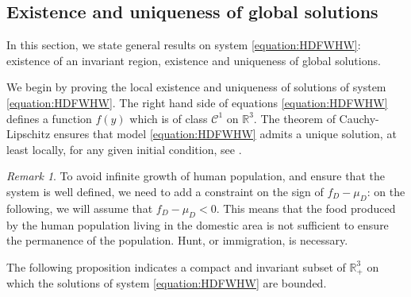\documentclass{article}
\theoremstyle{definition}
\theoremstyle{remark}
\newtheorem{remark}[theorem]{Remark}
\begin{document}
\subsection{Existence and uniqueness of global solutions}
In this section, we state general results on system \eqref{equation:HDFWHW}:  existence of an invariant region, existence and uniqueness of global solutions.

We begin by proving the local existence and uniqueness of solutions of system \eqref{equation:HDFWHW}. The right hand side of equations \eqref{equation:HDFWHW} defines a function $f(y)$ which is of class $\mathcal{C}^1$ on $\mathbb{R}^3$. The theorem of Cauchy-Lipschitz ensures that model \eqref{equation:HDFWHW} admits a unique solution, at least locally, for any given initial condition, see \cite{walter_ordinary_1998}.

\begin{remark}
To avoid infinite growth of human population, and ensure that the system is well defined, we need to add a constraint on the sign of $f_D - \mu_D$: on the following, we will assume that $f_D - \mu_D < 0$. This means that the food produced by the human population living in the domestic area is not sufficient to ensure the permanence of the population. Hunt, or immigration, is necessary. 
\end{remark}

The following proposition indicates a compact and invariant subset of $\mathbb{R}_+^3$ on which the solutions of system \eqref{equation:HDFWHW} are bounded.
\end{document}
